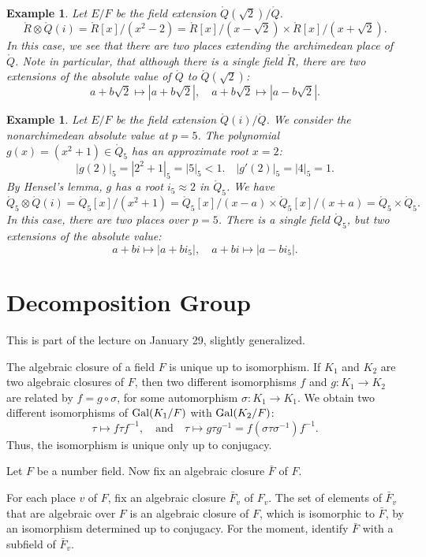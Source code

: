 \documentclass{amsart}
\newtheorem{example}[exercise]{Example}
\def\abs#1{{|#1|}}
\def\RR{\ring{R}}
\def\oG{\op{Gal}}
\begin{document}
\begin{example} Let $E/F$ be the field extension $\ring{Q}(\sqrt{2})/\ring{Q}$.
\[
\RR\otimes \ring{Q}(i) = \RR[x]/(x^2 - 2) = 
\RR[x]/(x - \sqrt{2}) \times
\RR[x]/(x + \sqrt{2}).
\]
In this case, we see that there are two places extending the archimedean
place of $\ring{Q}$.  Note in particular, that although there is a single field
$\RR$, there are two extensions of the absolute value of $\ring{Q}$ to
$\ring{Q}(\sqrt{2})$:
\[
a+ b\sqrt{2}\mapsto \abs{a + b \sqrt{2}},\quad a + b\sqrt{2}\mapsto \abs{a-b\sqrt{2}}.
\]
\end{example}

\begin{example} Let $E/F$ be the field extension $\ring{Q}(i)/\ring{Q}$.
We consider the nonarchimedean absolute value at $p=5$.
The polynomial $g(x)=(x^2+1)\in\ring{Q}_5$ has an approximate root $x=2$:
\[
\abs{g(2)}_5=\abs{2^2 + 1}_5=\abs{5}_5 < 1.\quad \abs{g'(2)}_5 = \abs{4}_5=1.
\]
By Hensel's lemma, $g$ has a root $i_5\approx 2$ in $\ring{Q}_5$. We have
\[
\ring{Q}_5\otimes \ring{Q}(i) = \ring{Q}_5[x]/(x^2+1) = 
\ring{Q}_5[x]/(x - a)\times
\ring{Q}_5[x]/(x+a) = \ring{Q}_5\times\ring{Q}_5.
\]
In this case, there are two places over $p=5$.  There is a single field
$\ring{Q}_5$, but two extensions of the absolute value:
\[
a + b i \mapsto \abs{a + b i_5},\quad
a + b i \mapsto \abs{a - b i_5}.
\]
\end{example}



\newpage
\section{Decomposition Group}

This is part of the lecture on January 29, slightly generalized.

The algebraic closure of a field $F$ is unique up to isomorphism.
If $K_1$ and $K_2$ are two algebraic closures of $F$, then two different
isomorphisms $f$ and $g:K_1\to K_2$ are related by $f = g \circ \sigma$, for some 
automorphism $\sigma: K_1\to K_1$.  We obtain two different isomorphisms
of $\oG(K_1/F)$ with $\oG(K_2/F)$:
\[
\tau \mapsto f \tau f^{-1},\quad \text{and}\quad 
\tau\mapsto g\tau g^{-1} = f (\sigma\tau\sigma^{-1}) f^{-1}.
\]
Thus, the isomorphism is unique only up to conjugacy.  

Let $F$ be a number field.
Now fix an algebraic closure $\bar{F}$ of $F$.

For each place  $v$ of $F$, fix an algebraic closure $\bar{F}_v$ of
$F_v$.  The set of elements of $\bar{F}_v$ that are
algebraic over $F$ is an algebraic closure of $F$, which
is isomorphic to $\bar{F}$, by an isomorphism determined up to
conjugacy.  For the moment, identify $\bar{F}$ with a subfield
of $\bar{F}_v$.
\end{document}
